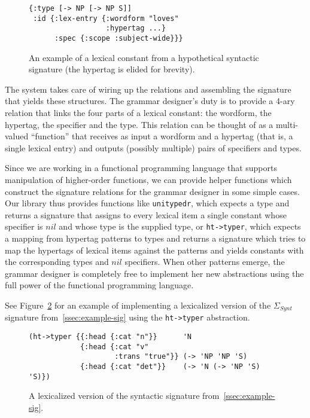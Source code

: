 \begin{figure}
  \centering
\begin{verbatim}
{:type [-> NP [-> NP S]]
 :id {:lex-entry {:wordform "loves"
                  :hypertag ...}
      :spec {:scope :subject-wide}}}
\end{verbatim}
  \caption{\label{fig:lex-const} An example of a lexical constant from a
    hypothetical syntactic signature (the hypertag is elided for brevity).}
\end{figure}

The system takes care of wiring up the relations and assembling the
signature that yields these structures. The grammar designer's duty is
to provide a 4-ary relation that links the four parts of a lexical
constant: the wordform, the hypertag, the specifier and the type. This
relation can be thought of as a multi-valued ``function'' that receives
as input a wordform and a hypertag (that is, a single lexical entry) and
outputs (possibly multiple) pairs of specifiers and types.

Since we are working in a functional programming language that supports
manipulation of higher-order functions, we can provide helper functions
which construct the signature relations for the grammar designer in some
simple cases. Our library thus provides functions like
\texttt{unitypedr}, which expects a type and returns a signature that
assigns to every lexical item a single constant whose specifier is $nil$
and whose type is the supplied type, or \texttt{ht->typer}, which
expects a mapping from hypertag patterns to types and returns a
signature which tries to map the hypertags of lexical items against the
patterns and yields constants with the corresponding types and $nil$
specifiers. When other patterns emerge, the grammar designer is
completely free to implement her new abstractions using the full power
of the functional programming language.

See Figure~\ref{fig:lex-sig-impl} for an example of implementing a
lexicalized version of the $\Sigma_{Synt}$ signature
from~\ref{ssec:example-sig} using the \texttt{ht->typer} abstraction.

\begin{figure}
  \centering
\begin{verbatim}
(ht->typer {{:head {:cat "n"}}      'N
            {:head {:cat "v"
                    :trans "true"}} (-> 'NP 'NP 'S)
            {:head {:cat "det"}}    (-> 'N (-> 'NP 'S) 'S)})
\end{verbatim}
  \caption{\label{fig:lex-sig-impl} A lexicalized version of the
    syntactic signature from~\ref{ssec:example-sig}.}
\end{figure}

